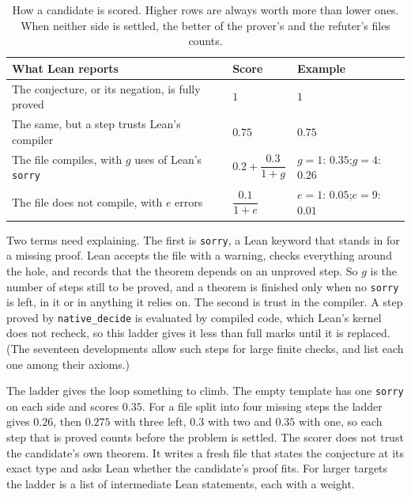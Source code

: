 \documentclass[11pt]{amsart}
\newcommand{\lean}[1]{\texttt{#1}}
\begin{document}
\begin{table}[ht]
\small
\begin{tabular}{@{}lll@{}}
\toprule
What Lean reports & Score & Example\\
\midrule
The conjecture, or its negation, is fully proved & $1$ & $1$\\
\addlinespace
The same, but a step trusts Lean's compiler & $0.75$ & $0.75$\\
\addlinespace
The file compiles, with $g$ uses of Lean's \lean{sorry} & $0.2+\dfrac{0.3}{1+g}$ & $g=1$: $0.35$;\quad $g=4$: $0.26$\\
\addlinespace
The file does not compile, with $e$ errors & $\dfrac{0.1}{1+e}$ & $e=1$: $0.05$;\quad $e=9$: $0.01$\\
\bottomrule
\end{tabular}
\medskip
\caption{How a candidate is scored. Higher rows are always worth more than lower ones. When neither side is settled, the better of the prover's and the refuter's files counts.}\label{tab:ladder}
\end{table}

Two terms need explaining. The first is \lean{sorry}, a Lean keyword that stands in for a missing proof. Lean accepts the file with a warning, checks everything around the hole, and records that the theorem depends on an unproved step. So $g$ is the number of steps still to be proved, and a theorem is finished only when no \lean{sorry} is left, in it or in anything it relies on. The second is trust in the compiler. A step proved by \lean{native\_decide} is evaluated by compiled code, which Lean's kernel does not recheck, so this ladder gives it less than full marks until it is replaced. (The seventeen developments allow such steps for large finite checks, and list each one among their axioms.)

The ladder gives the loop something to climb. The empty template has one \lean{sorry} on each side and scores $0.35$. For a file split into four missing steps the ladder gives $0.26$, then $0.275$ with three left, $0.3$ with two and $0.35$ with one, so each step that is proved counts before the problem is settled. The scorer does not trust the candidate's own theorem. It writes a fresh file that states the conjecture at its exact type and asks Lean whether the candidate's proof fits. For larger targets the ladder is a list of intermediate Lean statements, each with a weight.
\end{document}
